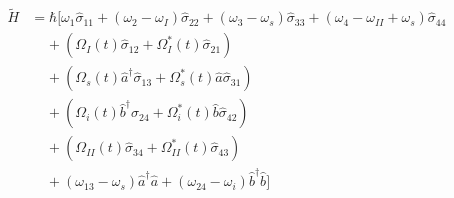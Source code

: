 \documentclass[aps,pra,showpacs,amsmath,amssymb,nofootinbib,longbibliography,superscriptaddress
]{revtex4-1}
\theoremstyle{definition}
\theoremstyle{remark}
\newcommand{\0}{\hat{0}}
\begin{document}
\begin{align}
    \tilde{H}
    &=
    \hbar \biggl[
        \omega_1 \hat{\sigma}_{11} +
        (\omega_2 - \omega_I) \hat{\sigma}_{22} +
        (\omega_3 - \omega_s) \hat{\sigma}_{33} +
        (\omega_4 - \omega_{II} + \omega_s) \hat{\sigma}_{44} \nonumber \\
        &\;\;\;\;+
        \left(
            \Omega_{I}(t) \hat{\sigma}_{12} +
            \Omega_{I}^*(t) \hat{\sigma}_{21}
        \right)\nonumber \\
        &\;\;\;\;+
        \left(
            \Omega_{s}(t) \hat{a}^{\dagger} \hat{\sigma}_{13} +
            \Omega_{s}^*(t) \hat{a} \hat{\sigma}_{31}
        \right) \nonumber \\
        &\;\;\;\;+ 
        \left(
            \Omega_{i}(t) \hat{b}^{\dagger} \hat{\sigma}_{24} +
            \Omega_{i}^*(t) \hat{b} \hat{\sigma}_{42}
        \right) \nonumber \\
        &\;\;\;\;+
        \left(
            \Omega_{II}(t) \hat{\sigma}_{34} +
            \Omega_{II}^*(t) \hat{\sigma}_{43}
        \right) \nonumber \\
        &\;\;\;\;+
        (\omega_{13} - \omega_s) \hat{a}^{\dagger}\hat{a} +
        (\omega_{24} - \omega_i) \hat{b}^{\dagger}\hat{b}
    \biggr]
\end{align}
\end{document}
